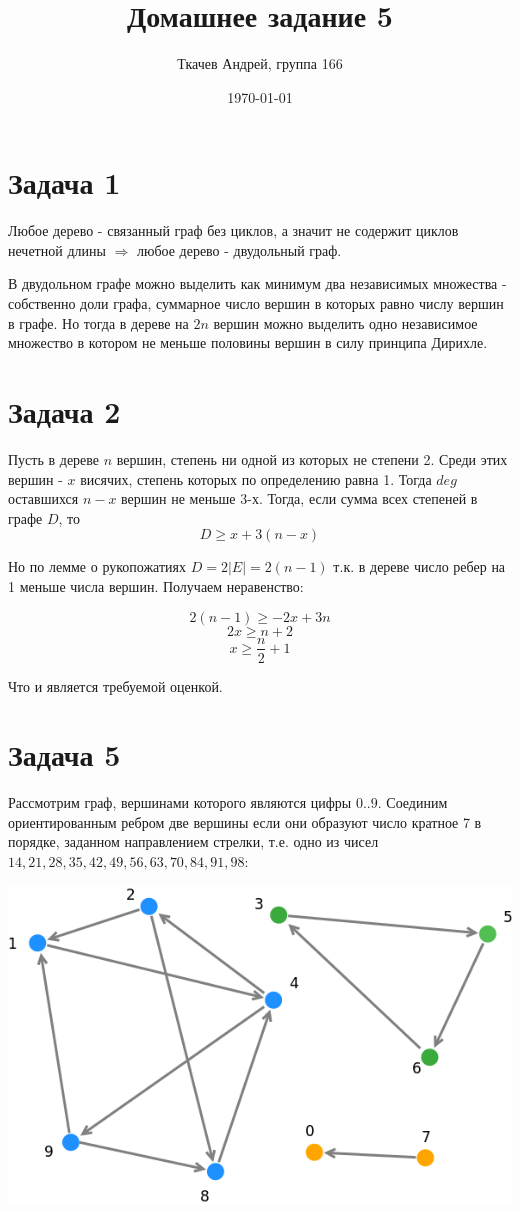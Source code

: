 \documentclass{article}
\title{Домашнее задание 5}
\author{Ткачев Андрей, группа 166}
\date{\today}
\begin{document}
	\maketitle
	
	\section{Задача 1}
	Любое дерево - связанный граф без циклов, а значит не содержит циклов нечетной длины $\Rightarrow$ любое дерево - двудольный граф. 
		
	В двудольном графе можно выделить как минимум два независимых множества - собственно доли графа, суммарное число вершин в которых равно числу вершин в графе. Но тогда в дереве на $2n$ вершин можно выделить одно независимое множество в котором не меньше половины вершин в силу принципа Дирихле.
	
	\section{Задача 2}
	Пусть в дереве $n$ вершин, степень ни одной из которых не степени 2. Среди этих вершин - $x$ висячих, степень которых по определению равна 1. Тогда $deg$ оставшихся $n - x$ вершин не меньше 3-х. Тогда, если сумма всех степеней в графе $D$, то
	$$ D \geqslant x  + 3(n - x)$$
	
	Но по лемме о рукопожатиях $D = 2|E| = 2(n - 1)$ т.к. в дереве число ребер на 1 меньше числа вершин. Получаем неравенство:
	
	$$ 2(n - 1) \geqslant -2x + 3n$$
	$$ 2x \geqslant n + 2$$
	$$ x \geqslant \frac{n}{2} + 1$$
	
	Что и является требуемой оценкой.
	
	\section{Задача 5}
	
	Рассмотрим граф, вершинами которого являются цифры $0 .. 9$. Соединим ориентированным ребром две вершины если они образуют число кратное 7 в порядке, заданном направлением стрелки, т.е. одно из чисел $14, 21, 28, 35, 42, 49, 56, 63, 70, 84, 91, 98$:
	
	\includegraphics[scale=0.6]{5_1}
	
\end{document}

